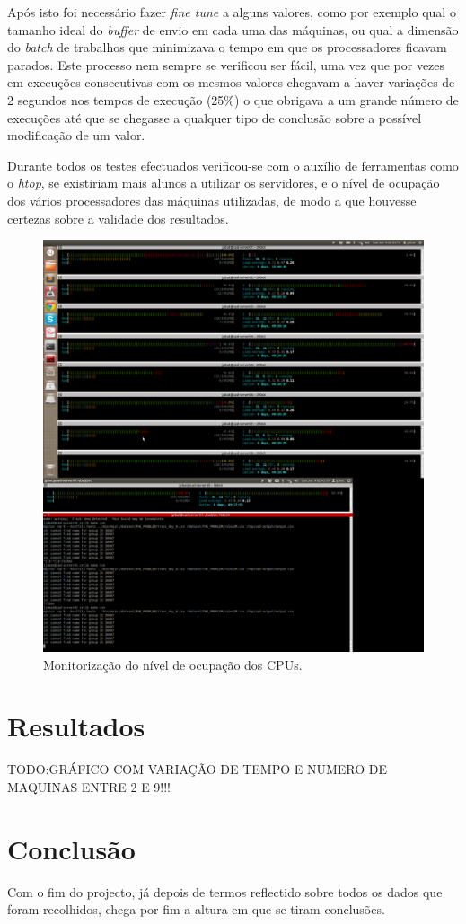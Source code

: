 \documentclass[a4paper]{article}
\begin{document}
Após isto foi necessário fazer \textit{fine tune} a alguns valores, como por exemplo qual o tamanho ideal do \textit{buffer} de envio em cada uma das máquinas, ou qual a dimensão do \textit{batch} de trabalhos que minimizava o tempo em que os processadores ficavam parados. Este processo nem sempre se verificou ser fácil, uma vez que por vezes em execuções consecutivas com os mesmos valores chegavam a haver variações de 2 segundos nos tempos de execução (25\%) o que obrigava a um grande número de execuções até que se chegasse a qualquer tipo de conclusão sobre a possível modificação de um valor.

Durante todos os testes efectuados verificou-se com o auxílio de ferramentas como o \textit{htop}, se existiriam mais alunos a utilizar os servidores, e o nível de ocupação dos vários processadores das máquinas utilizadas, de modo a que houvesse certezas sobre a validade dos resultados.
\begin{figure}[h]
	\includegraphics[keepaspectratio=true, width=0.4\textheight]{imgs/ocupacao.png}
	\caption{Monitorização do nível de ocupação dos CPUs.}
\end{figure}
\clearpage


\section{Resultados}
\indent \indent TODO:GRÁFICO COM VARIAÇÃO DE TEMPO E NUMERO DE MAQUINAS ENTRE 2 E 9!!!
\clearpage


\section{Conclusão}
\indent \indent Com o fim do projecto, já depois de termos reflectido sobre todos os dados que foram recolhidos, chega por fim a altura em que se tiram conclusões.


\clearpage
\end{document}
